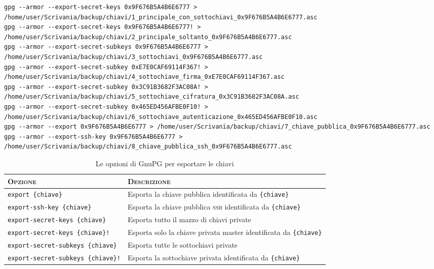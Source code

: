 \begin{lstlisting}
gpg --armor --export-secret-keys 0x9F676B5A4B6E6777 > /home/user/Scrivania/backup/chiavi/1_principale_con_sottochiavi_0x9F676B5A4B6E6777.asc
gpg --armor --export-secret-keys 0x9F676B5A4B6E6777! > /home/user/Scrivania/backup/chiavi/2_principale_soltanto_0x9F676B5A4B6E6777.asc
gpg --armor --export-secret-subkeys 0x9F676B5A4B6E6777 > /home/user/Scrivania/backup/chiavi/3_sottochiavi_0x9F676B5A4B6E6777.asc
gpg --armor --export-secret-subkey 0xE7E0CAF69114F367! > /home/user/Scrivania/backup/chiavi/4_sottochiave_firma_0xE7E0CAF69114F367.asc
gpg --armor --export-secret-subkey 0x3C91B3682F3AC08A! > /home/user/Scrivania/backup/chiavi/5_sottochiave_cifratura_0x3C91B3682F3AC08A.asc
gpg --armor --export-secret-subkey 0x465ED456AFBE0F10! > /home/user/Scrivania/backup/chiavi/6_sottochiave_autenticazione_0x465ED456AFBE0F10.asc
gpg --armor --export 0x9F676B5A4B6E6777 > /home/user/Scrivania/backup/chiavi/7_chiave_pubblica_0x9F676B5A4B6E6777.asc
gpg --armor --export-ssh-key 0x9F676B5A4B6E6777 > /home/user/Scrivania/backup/chiavi/8_chiave_pubblica_ssh_0x9F676B5A4B6E6777.asc
\end{lstlisting}

\begin{table}
    \centering
	\begin{tabularx}{\textwidth}{ll}
 		\toprule
		\textsc{Opzione} & \textsc{Descrizione} \\
		\midrule
		\texttt{export \{chiave\}}                 & Esporta la chiave pubblica identificata da \texttt{\{chiave\}}              \\
		\texttt{export-ssh-key \{chiave\}}         & Esporta la chiave pubblica \textsc{ssh} identificata da \texttt{\{chiave\}} \\
		\texttt{export-secret-keys \{chiave\}}     & Esporta tutto il mazzo di chiavi private                                    \\
		\texttt{export-secret-keys \{chiave\}!}    & Esporta solo la chiave privata master identificata da \texttt{\{chiave\}}   \\
		\texttt{export-secret-subkeys \{chiave\}}  & Esporta tutte le sottochiavi private                                        \\
		\texttt{export-secret-subkeys \{chiave\}!} & Esporta la sottochiave privata identificata da \texttt{\{chiave\}}          \\
		\bottomrule
	\end{tabularx}
	\caption{Le opzioni di GnuPG per esportare le chiavi}
	\label{table:exportkeys}
\end{table}

